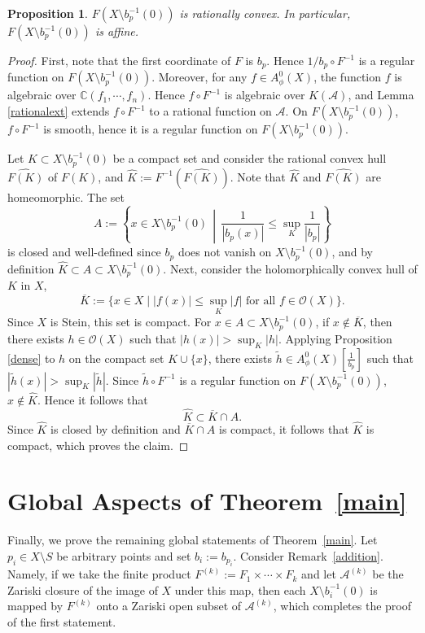 \documentclass[a4paper, 12pt]{article}
\newcommand{\cA}{\mathcal{A}}
\newtheorem{prop}[thm]{Proposition}
\begin{document}
\begin{prop}\label{main1}
$F(X \setminus b_p^{-1}(0))$ is rationally convex. In particular, $F(X \setminus b_p^{-1}(0))$ is affine.
\end{prop}

\begin{proof}
First, note that the first coordinate of $F$ is $b_p$. Hence $1/b_p \circ F^{-1}$ is a regular function on $F(X \setminus b_p^{-1}(0))$. Moreover, for any $f \in A_\phi^0(X)$, the function $f$ is algebraic over $\mathbb{C}(f_1,\cdots,f_n)$. Hence $f\circ F^{-1}$ is algebraic over $K(\cA)$, and Lemma \ref{rationalext} extends $f\circ F^{-1}$ to a rational function on $\cA$. On $F(X\setminus b_p^{-1}(0))$, $f\circ F^{-1}$ is smooth, hence it is a regular function on $F(X\setminus b_p^{-1}(0))$. 

Let $K \subset X \setminus b_p^{-1}(0)$ be a compact set and consider the rational convex hull $\widehat{F(K)}$ of $F(K)$, and $\widehat{K}:=F^{-1}\left(\widehat{F(K)}\right)$. Note that $\widehat{K}$ and $\widehat{F(K)}$ are homeomorphic. The set
\[
A:=\left\{x\in X \setminus b_p^{-1}(0) \,\middle|\, \frac{1}{|b_p(x)|} \le \sup_K \frac{1}{|b_p|} \right\}
\]
is closed and well-defined since $b_p$ does not vanish on $X \setminus b_p^{-1}(0)$, and by definition $\widehat{K} \subset A\subset X\setminus b_p^{-1}(0)$. Next, consider the holomorphically convex hull of $K$ in $X$,
\[
\overline{K}:=\{x \in X \mid |f(x)| \le \sup_K |f| \text{ for all } f \in \mathcal{O}(X)\}.
\]
Since $X$ is Stein, this set is compact. For $x \in A\subset X\setminus b_p^{-1}(0)$, if $x \notin \overline{K}$, then there exists $h \in \mathcal{O}(X)$ such that $|h(x)| > \sup_K |h|$. Applying Proposition \ref{dense} to $h$ on the compact set $K \cup \{x\}$, there exists $\tilde{h} \in A_\phi^0(X)[\frac{1}{b_p}]$ such that $|\tilde{h}(x)| > \sup_K |\tilde{h}|$. Since $\tilde h\circ F^{-1}$ is a regular function on $F(X\setminus b_p^{-1}(0))$, $x\notin\widehat{K}$. Hence it follows that
\[
\widehat{K} \subset \overline{K} \cap A.
\]
Since $\widehat{K}$ is closed by definition and $\overline{K} \cap A$ is compact, it follows that $\widehat{K}$ is compact, which proves the claim.
\end{proof}

\section{Global Aspects of Theorem~\ref{main}}
Finally, we prove the remaining global statements of Theorem~\ref{main}. Let $p_i\in X\setminus S$ be arbitrary points and set $b_i:=b_{p_i}$. Consider Remark~\ref{addition}. Namely, if we take the finite product $F^{(k)}:=F_1\times\cdots\times F_k$ and let $\cA^{(k)}$ be the Zariski closure of the image of $X$ under this map, then each $X\setminus b_i^{-1}(0)$ is mapped by $F^{(k)}$ onto a Zariski open subset of $\cA^{(k)}$, which completes the proof of the first statement.
\end{document}
